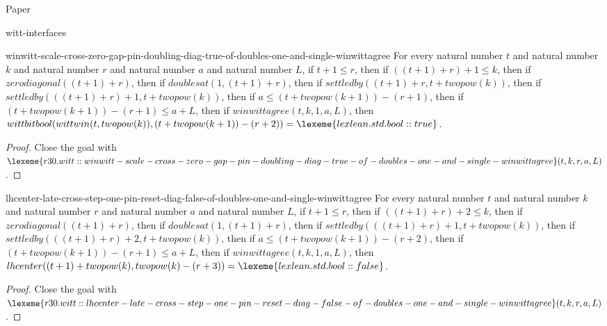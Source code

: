 \begin{lexlean}{Paper}
\begin{section}{witt-interfaces}
  \begin{theorem}{winwitt-scale-cross-zero-gap-pin-doubling-diag-true-of-doubles-one-and-single-winwittagree}
  For every natural number \(t\) and natural number \(k\) and natural number \(r\) and natural number \(a\) and natural number \(L\), if \(t + 1 ≤ r\), then if \(((t + 1) + r) + 1 ≤ k\), then if \(zerodiagonal((t + 1) + r)\), then if \(doublesat(1, (t + 1) + r)\), then if \(settledby((t + 1) + r, t + twopow(k))\), then if \(settledby(((t + 1) + r) + 1, t + twopow(k))\), then if \(a ≤ (t + twopow(k + 1)) - (r + 1)\), then if \((t + twopow(k + 1)) - (r + 1) ≤ a + L\), then if \(winwittagree(t, k, 1, a, L)\), then \(wittbitbool(wittwin(t, twopow(k)), (t + twopow(k + 1)) - (r + 2)) = \lexeme{lexlean.std.bool::true}\).
  \begin{proof}
  Close the goal with \(\lexeme{r30.witt::winwitt-scale-cross-zero-gap-pin-doubling-diag-true-of-doubles-one-and-single-winwittagree}(t, k, r, a, L)\).
  \end{proof}
  \end{theorem}

  \begin{theorem}{lhcenter-late-cross-step-one-pin-reset-diag-false-of-doubles-one-and-single-winwittagree}
  For every natural number \(t\) and natural number \(k\) and natural number \(r\) and natural number \(a\) and natural number \(L\), if \(t + 1 ≤ r\), then if \(((t + 1) + r) + 2 ≤ k\), then if \(zerodiagonal((t + 1) + r)\), then if \(doublesat(1, (t + 1) + r)\), then if \(settledby(((t + 1) + r) + 1, t + twopow(k))\), then if \(settledby(((t + 1) + r) + 2, t + twopow(k))\), then if \(a ≤ (t + twopow(k + 1)) - (r + 2)\), then if \((t + twopow(k + 1)) - (r + 1) ≤ a + L\), then if \(winwittagree(t, k, 1, a, L)\), then \(lhcenter((t + 1) + twopow(k), twopow(k) - (r + 3)) = \lexeme{lexlean.std.bool::false}\).
  \begin{proof}
  Close the goal with \(\lexeme{r30.witt::lhcenter-late-cross-step-one-pin-reset-diag-false-of-doubles-one-and-single-winwittagree}(t, k, r, a, L)\).
  \end{proof}
  \end{theorem}


\end{section}
\end{lexlean}
